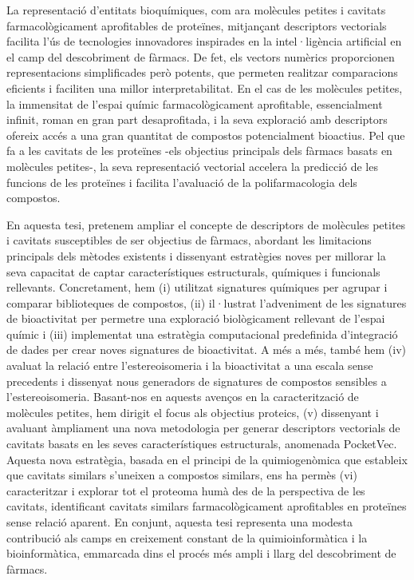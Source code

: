 
La representació d'entitats bioquímiques, com ara molècules petites i cavitats farmacològicament aprofitables de proteïnes, mitjançant descriptors vectorials facilita l'ús de tecnologies innovadores inspirades en la intel·ligència artificial en el camp del descobriment de fàrmacs. De fet, els vectors numèrics proporcionen representacions simplificades però potents, que permeten realitzar comparacions eficients i faciliten una millor interpretabilitat. En el cas de les molècules petites, la immensitat de l'espai químic farmacològicament aprofitable, essencialment infinit, roman en gran part desaprofitada, i la seva exploració amb descriptors ofereix accés a una gran quantitat de compostos potencialment bioactius. Pel que fa a les cavitats de les proteïnes -els objectius principals dels fàrmacs basats en molècules petites-, la seva representació vectorial accelera la predicció de les funcions de les proteïnes i facilita l'avaluació de la polifarmacologia dels compostos. 

En aquesta tesi, pretenem ampliar el concepte de descriptors de molècules petites i cavitats susceptibles de ser objectius de fàrmacs, abordant les limitacions principals dels mètodes existents i dissenyant estratègies noves per millorar la seva capacitat de captar característiques estructurals, químiques i funcionals rellevants. Concretament, hem (i) utilitzat signatures químiques per agrupar i comparar biblioteques de compostos, (ii) il·lustrat l'adveniment de les signatures de bioactivitat per permetre una exploració biològicament rellevant de l'espai químic i (iii) implementat una estratègia computacional predefinida d'integració de dades per crear noves signatures de bioactivitat. A més a més, també hem (iv) avaluat la relació entre l'estereoisomeria i la bioactivitat a una escala sense precedents i dissenyat nous generadors de signatures de compostos sensibles a l'estereoisomeria. Basant-nos en aquests avenços en la caracterització de molècules petites, hem dirigit el focus als objectius proteics, (v) dissenyant i avaluant àmpliament una nova metodologia per generar descriptors vectorials de cavitats basats en les seves característiques estructurals, anomenada PocketVec. Aquesta nova estratègia, basada en el principi de la quimiogenòmica que estableix que cavitats similars s'uneixen a compostos similars, ens ha permès (vi) caracteritzar i explorar tot el proteoma humà des de la perspectiva de les cavitats, identificant cavitats similars farmacològicament aprofitables en proteïnes sense relació aparent. En conjunt, aquesta tesi representa una modesta contribució als camps en creixement constant de la quimioinformàtica i la bioinformàtica, emmarcada dins el procés més ampli i llarg del descobriment de fàrmacs.